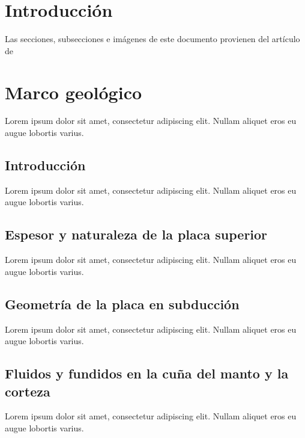 \documentclass[5p,times,authoryear]{elsarticle}
\begin{document}
\tableofcontents


\section{Introducción}
Las secciones, subsecciones e imágenes de este documento provienen del artículo de \cite{Ferrari2}

\section{Marco geológico}
	Lorem ipsum dolor sit amet, consectetur adipiscing elit. Nullam aliquet eros eu augue lobortis varius.
    
	\subsection{Introducción}
    Lorem ipsum dolor sit amet, consectetur adipiscing elit. Nullam aliquet eros eu augue lobortis varius.
    
	\subsection{Espesor y naturaleza de la placa superior}
        Lorem ipsum dolor sit amet, consectetur adipiscing elit. Nullam aliquet eros eu augue lobortis varius.
        
	\subsection{Geometría de la placa en subducción}
        Lorem ipsum dolor sit amet, consectetur adipiscing elit. Nullam aliquet eros eu augue lobortis varius.
        
	\subsection{Fluidos y fundidos en la cuña del manto y la corteza}
        Lorem ipsum dolor sit amet, consectetur adipiscing elit. Nullam aliquet eros eu augue lobortis varius.
        
\end{document}
